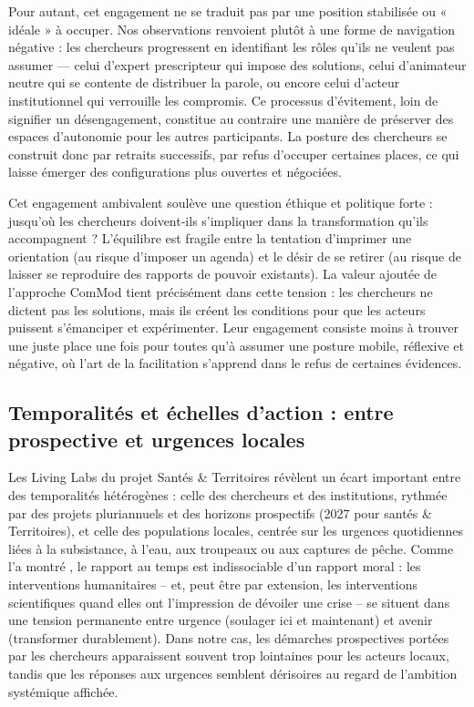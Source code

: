 \documentclass{article}
\begin{document}
Pour autant, cet engagement ne se traduit pas par une position stabilisée ou « idéale » à occuper. Nos observations renvoient plutôt à une forme de navigation négative \parencite{morizot_manieres_2020}: les chercheurs progressent en identifiant les rôles qu’ils ne veulent pas assumer — celui d’expert prescripteur qui impose des solutions, celui d’animateur neutre qui se contente de distribuer la parole, ou encore celui d’acteur institutionnel qui verrouille les compromis. Ce processus d’évitement, loin de signifier un désengagement, constitue au contraire une manière de préserver des espaces d’autonomie pour les autres participants. La posture des chercheurs se construit donc par retraits successifs, par refus d’occuper certaines places, ce qui laisse émerger des configurations plus ouvertes et négociées.

Cet engagement ambivalent soulève une question éthique et politique forte : jusqu’où les chercheurs doivent-ils s’impliquer dans la transformation qu’ils accompagnent ? L’équilibre est fragile entre la tentation d’imprimer une orientation (au risque d’imposer un agenda) et le désir de se retirer (au risque de laisser se reproduire des rapports de pouvoir existants). La valeur ajoutée de l'approche ComMod tient précisément dans cette tension : les chercheurs ne dictent pas les solutions, mais ils créent les conditions pour que les acteurs puissent s’émanciper et expérimenter. Leur engagement consiste moins à trouver une juste place une fois pour toutes qu’à assumer une posture mobile, réflexive et négative, où l’art de la facilitation s’apprend dans le refus de certaines évidences.

\subsection{Temporalités et échelles d’action : entre prospective et urgences locales}

Les Living Labs du projet Santés \& Territoires révèlent un écart important entre des temporalités hétérogènes : celle des chercheurs et des institutions, rythmée par des projets pluriannuels et des horizons prospectifs (2027 pour santés \& Territoires), et celle des populations locales, centrée sur les urgences quotidiennes liées à la subsistance, à l’eau, aux troupeaux ou aux captures de pêche. Comme l’a montré \textcite{fassin_raison_2010}, le rapport au temps est indissociable d’un rapport moral : les interventions humanitaires -- et, peut être par extension, les interventions scientifiques quand elles ont l'impression de dévoiler une crise -- se situent dans une tension permanente entre urgence (soulager ici et maintenant) et avenir (transformer durablement). Dans notre cas, les démarches prospectives portées par les chercheurs apparaissent souvent trop lointaines pour les acteurs locaux, tandis que les réponses aux urgences semblent dérisoires au regard de l’ambition systémique affichée.
\end{document}
